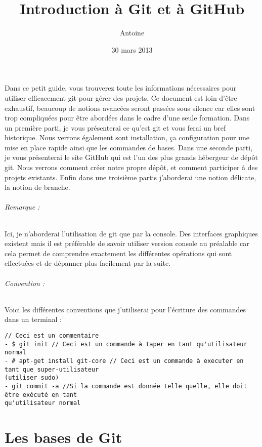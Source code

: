 \documentclass[a4paper]{article}
\title{Introduction à Git et à GitHub}
\author{Antoine \bsc{Wacheux}}
\date{30 mars 2013}
\begin{document}
\maketitle

Dans ce petit guide, vous trouverez toute les informations nécessaires pour utiliser efficacement git pour gérer des projets. Ce document est loin d'être exhaustif, beaucoup de notions avancées seront passées sous silence car elles sont trop compliquées pour être abordées dans le cadre d'une seule formation. Dans un première parti, je vous présenterai ce qu'est git et vous ferai un bref historique. Nous verrons également sont installation, ça configuration pour une mise en place rapide ainsi que les commandes de bases. Dans une seconde parti, je vous présenterai le site GitHub qui est l'un des plus grands hébergeur de dépôt git. Nous verrons comment créer notre propre dépôt, et comment participer à des projets existants. Enfin dans une troisième partis j'aborderai une notion délicate, la notion de branche. 

\paragraph{Remarque :} Ici, je n'aborderai l'utilisation de git que par la console. Des interfaces graphiques existent mais il est préférable de savoir utiliser version console au préalable car cela permet de comprendre exactement les différentes opérations qui sont effectuées et de dépanner plus facilement par la suite. 

\paragraph{Convention :} Voici les différentes conventions que j'utiliserai pour l'écriture des commandes dans un terminal : 

\begin{verbatim}
// Ceci est un commentaire
- $ git init // Ceci est un commande à taper en tant qu'utilisateur normal
- # apt-get install git-core // Ceci est un commande à executer en tant que super-utilisateur 
(utiliser sudo)
- git commit -a //Si la commande est donnée telle quelle, elle doit être exécuté en tant 
qu'utilisateur normal
\end{verbatim}

\tableofcontents

\part{Les bases de Git}
\end{document}
